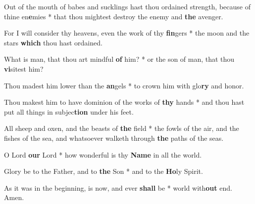 \begin{multicols}{2}
	Out of the mouth of babes and sucklings hast thou ordained strength, because of thine en\textbf{e}mies * that thou mightest destroy the enemy and \textbf{the} avenger.
	
	For I will consider thy heavens, even the work of thy \textbf{fin}gers * the moon and the stars \textbf{which} thou hast ordained.
	
	What is man, that thou art mindful \textbf{of} him? * or the son of man, that thou \textbf{vi}sitest him?
	
	Thou madest him lower than the \textbf{an}gels * to crown him with glo\textbf{ry} and honor.
	
	Thou makest him to have dominion of the works of \textbf{thy} hands * and thou hast put all things in subjec\textbf{tion} under his feet.
	
	All sheep and oxen, and the beasts of \textbf{the} field * the fowls of the air, and the fishes of the sea, and whatsoever walketh through \textbf{the} paths of the seas.
	
	O Lord \textbf{our} Lord * how wonderful is thy \textbf{Name} in all the world.
	
	Glory be to the Father, and to \textbf{the} Son * and to the \textbf{Ho}ly Spirit.
	
	As it was in the beginning, is now, and ever \textbf{shall} be * world with\textbf{out} end. Amen.
\end{multicols}